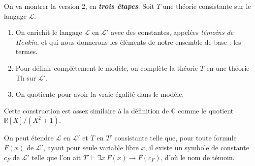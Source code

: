 \documentclass[./main]{subfiles}
\begin{document}
  On va montrer la version 2, en \textbf{\textit{trois étapes}}.
  Soit $T$ une théorie consistante sur le langage $\mathcal{L}$.
  \begin{enumerate}
    \item On enrichit le langage $\mathcal{L}$ en $\mathcal{L}'$  avec des constantes, appelées \textit{témoins de Henkin}, et qui nous donnerons les éléments de notre ensemble de base : les termes.
    \item Pour définir complètement le modèle, on complète la théorie $T$ en une théorie $\mathrm{Th}$ sur $\mathcal{L}'$.
    \item On quotiente pour avoir la vraie égalité dans le modèle.
  \end{enumerate}

  Cette construction est assez similaire à la définition de $\mathds{C}$ comme le quotient $\mathds{R}[X] / (X^2 + 1)$.

  \begin{prop}
    On peut étendre $\mathcal{L}$ en $\mathcal{L}'$ et $T$ en $T'$ consistante telle que, pour toute formule $F(x)$ de $\mathcal{L}'$, ayant pour seule variable libre $x$, il existe un symbole de constante $c_F$ de $\mathcal{L}'$ telle que l'on ait $T' \vdash \exists x\: F(x) \to F(c_F)$, d'où le nom de témoin.
  \end{prop}
\end{document}
